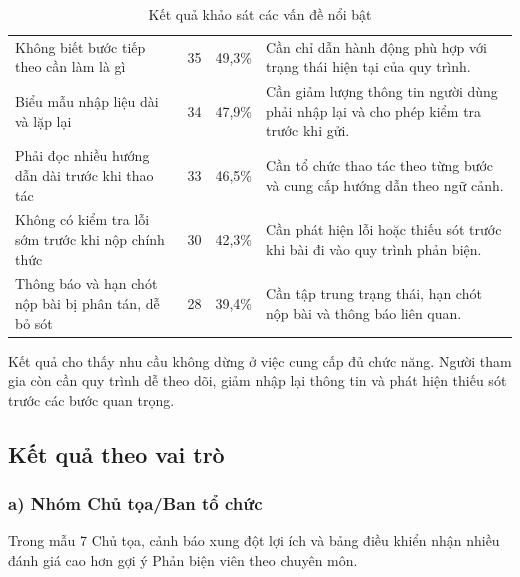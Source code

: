 \begin{table}[!htbp]
\caption{Kết quả khảo sát các vấn đề nổi bật}
\label{tab:ch2-survey-top-issues}
\centering
\setlength{\tabcolsep}{2pt}
\renewcommand{\arraystretch}{1.15}
\begin{tabular}{|P{0.32\textwidth}|C{0.12\textwidth}|C{0.11\textwidth}|P{0.38\textwidth}|}
\hline
{} &  &  &  \\ \hline
Không biết bước tiếp theo cần làm là gì & 35 & 49,3\% & Cần chỉ dẫn hành động phù hợp với trạng thái hiện tại của quy trình. \\ \hline
Biểu mẫu nhập liệu dài và lặp lại & 34 & 47,9\% & Cần giảm lượng thông tin người dùng phải nhập lại và cho phép kiểm tra trước khi gửi. \\ \hline
Phải đọc nhiều hướng dẫn dài trước khi thao tác & 33 & 46,5\% & Cần tổ chức thao tác theo từng bước và cung cấp hướng dẫn theo ngữ cảnh. \\ \hline
Không có kiểm tra lỗi sớm trước khi nộp chính thức & 30 & 42,3\% & Cần phát hiện lỗi hoặc thiếu sót trước khi bài đi vào quy trình phản biện. \\ \hline
Thông báo và hạn chót nộp bài bị phân tán, dễ bỏ sót & 28 & 39,4\% & Cần tập trung trạng thái, hạn chót nộp bài và thông báo liên quan. \\ \hline
\end{tabular}
\end{table}

Kết quả cho thấy nhu cầu không dừng ở việc cung cấp đủ chức năng. Người tham gia còn cần quy trình dễ theo dõi, giảm nhập lại thông tin và phát hiện thiếu sót trước các bước quan trọng.

\subsection{Kết quả theo vai trò}
\label{subsec:ch2-survey-roles}

\subsubsection{a) Nhóm Chủ tọa/Ban tổ chức}

Trong mẫu 7 Chủ tọa, cảnh báo xung đột lợi ích và bảng điều khiển nhận nhiều đánh giá cao hơn gợi ý Phản biện viên theo chuyên môn.

